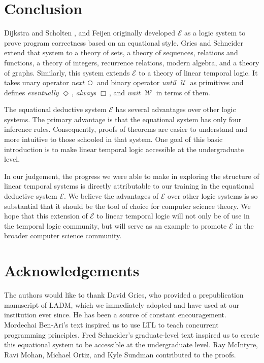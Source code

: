 \documentclass[12pt, fleqn, leqno]{article}
\newcommand{\Until}{\;\mathcal{U}\;}
\newcommand{\Wait}{\;\mathcal{W}\;}
\newcommand{\Next}{\;\,\text{\raisebox{3.5pt}{\circle{6}}}}
\newcommand{\Event}{\Diamond\,}
\newcommand{\Always}{\Box\,}
\begin{document}
\section{Conclusion}

Dijkstra and Scholten \cite{DandS}, and Feijen \cite{Feij} originally developed $\mathcal{E}$ as a logic system to prove
program correctness based on an equational style.
Gries and Schneider \cite{LADM} extend that system to a theory of sets, a theory of sequences,
relations and functions, a theory of integers, recurrence relations, modern algebra, and a theory of graphs.
Similarly, this system extends $\mathcal{E}$ to a theory of linear temporal logic.
It takes unary operator \textit{next} $\Next$ and binary operator \textit{until} $\Until$ as primitives and defines
\textit{eventually} $\Event$, \textit{always} $\Always$, and \textit{wait} $\Wait$ in terms of them.

The equational deductive system $\mathcal{E}$ has several advantages over other logic systems.
The primary advantage is that the equational system has only four inference rules.
Consequently, proofs of theorems are easier to understand and more intuitive to those schooled in that system.
One goal of this basic introduction is to make linear temporal logic accessible at the undergraduate level.

In our judgement, the progress we were able to make in exploring the structure of linear temporal systems
is directly attributable to our training in the equational deductive system $\mathcal{E}$.
We believe the advantages of $\mathcal{E}$ over other logic systems is so substantial that it should be the
tool of choice for computer science theory.
We hope that this extension of $\mathcal{E}$ to linear temporal logic will not only be of use in the
temporal logic community, but will serve as an example to promote $\mathcal{E}$ in the broader computer science community.

\section*{Acknowledgements}

The authors would like to thank David Gries, who provided a prepublication manuscript of LADM, which we immediately adopted and have used at our institution ever since.
He has been a source of constant encouragement.
Mordechai Ben-Ari's text \cite{Ben2} inspired us to use LTL to teach concurrent programming principles.
Fred Schneider's graduate-level text \cite{Schn} inspired us to create this equational system to be accessible at the undergraduate level.
Ray McIntyre, Ravi Mohan, Michael Ortiz, and Kyle Sundman contributed to the proofs.



\end{document}

